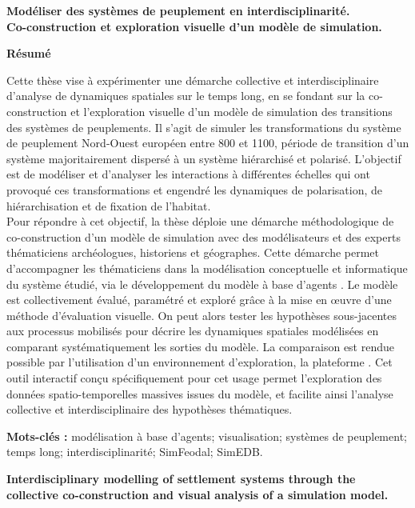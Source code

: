 {\large\textbf{Modéliser des systèmes de peuplement en interdisciplinarité.\\ Co-construction et exploration visuelle d'un modèle de simulation.}}

\textbf{Résumé}

\vspace*{-0.5em}
Cette thèse vise à expérimenter une démarche collective et interdisciplinaire d'analyse de dynamiques spatiales sur le temps long, en se fondant sur la co-construction et l'exploration visuelle d'un modèle de simulation des transitions des systèmes de peuplements.
Il s'agit de simuler les transformations du système de peuplement Nord-Ouest européen entre 800 et 1100, période de transition d'un système majoritairement dispersé à un système hiérarchisé et polarisé.
L'objectif est de modéliser et d'analyser les interactions à différentes échelles qui ont provoqué ces transformations et engendré les dynamiques de polarisation, de hiérarchisation et de fixation de l'habitat.\\
Pour répondre à cet objectif, la thèse déploie une démarche méthodologique de co-construction d'un modèle de simulation avec des modélisateurs et des experts thématiciens archéologues, historiens et géographes.
Cette démarche permet d'accompagner les thématiciens dans la modélisation conceptuelle et informatique du système étudié, via le développement du modèle à base d'agents \simfeodal{}.
Le modèle est collectivement évalué, paramétré et exploré grâce à la mise en œuvre d'une méthode d'évaluation visuelle.
On peut alors tester les hypothèses sous-jacentes aux processus mobilisés pour décrire les dynamiques spatiales modélisées en comparant systématiquement les sorties du modèle.
La comparaison est rendue possible par l'utilisation d'un environnement d'exploration, la plateforme \simedb{}.
Cet outil interactif conçu spécifiquement pour cet usage permet l'exploration des données spatio-temporelles massives issues du modèle, et facilite ainsi l'analyse collective et interdisciplinaire des hypothèses thématiques.

\textbf{Mots-clés :} 
modélisation à base d'agents; visualisation; systèmes de peuplement; temps long; interdisciplinarité; SimFeodal; SimEDB.

\vspace{1.2em}
{\large\textbf{Interdisciplinary modelling of settlement systems through the collective co-construction and visual analysis of a simulation model.}}

